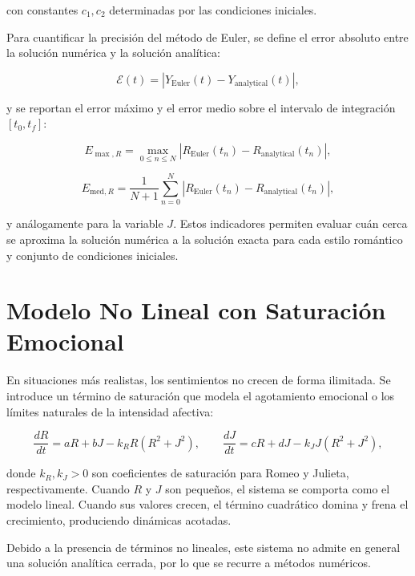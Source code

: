 \documentclass[12pt]{article}
\begin{document}
con constantes $c_1, c_2$ determinadas por las condiciones iniciales.

Para cuantificar la precisión del método de Euler, se define el error absoluto entre la solución numérica y la solución analítica:

\begin{equation}
\mathcal{E}(t) = \left| Y_{\text{Euler}}(t) - Y_{\text{analytical}}(t) \right|,
\end{equation}

y se reportan el error máximo y el error medio sobre el intervalo de integración $[t_0, t_f]$:

\begin{equation}
E_{\max,R} = \max_{0 \le n \le N} \left| R_{\text{Euler}}(t_n) - R_{\text{analytical}}(t_n) \right|,
\end{equation}

\begin{equation}
E_{\text{med},R} = \frac{1}{N+1} \sum_{n=0}^{N} \left| R_{\text{Euler}}(t_n) - R_{\text{analytical}}(t_n) \right|,
\end{equation}

y análogamente para la variable $J$. Estos indicadores permiten evaluar cuán cerca se aproxima la solución numérica a la solución exacta para cada estilo romántico y conjunto de condiciones iniciales.

\section{Modelo No Lineal con Saturación Emocional}

En situaciones más realistas, los sentimientos no crecen de forma ilimitada. Se introduce un término de saturación que modela el agotamiento emocional o los límites naturales de la intensidad afectiva:

\begin{equation}
\frac{dR}{dt} = aR + bJ - k_R R (R^2 + J^2), \qquad
\frac{dJ}{dt} = cR + dJ - k_J J (R^2 + J^2),
\end{equation}

donde $k_R, k_J > 0$ son coeficientes de saturación para Romeo y Julieta, respectivamente. Cuando $R$ y $J$ son pequeños, el sistema se comporta como el modelo lineal. Cuando sus valores crecen, el término cuadrático domina y frena el crecimiento, produciendo dinámicas acotadas.

Debido a la presencia de términos no lineales, este sistema no admite en general una solución analítica cerrada, por lo que se recurre a métodos numéricos.
\end{document}
